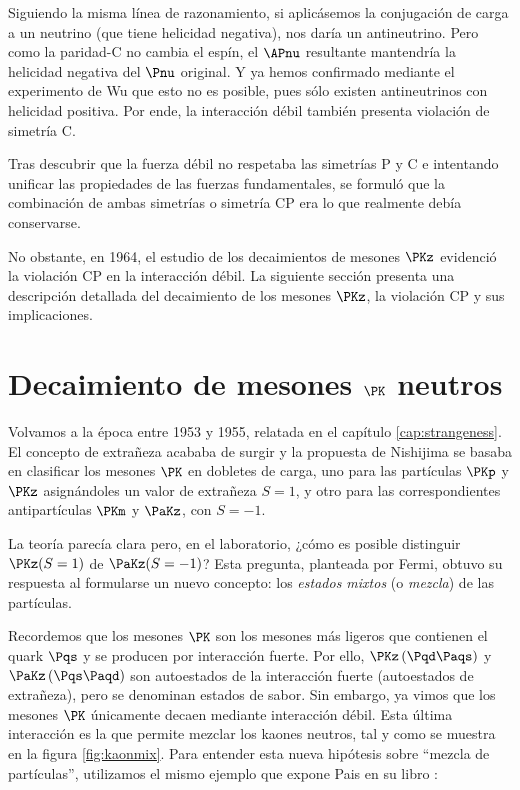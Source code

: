 Siguiendo la misma línea de razonamiento, si aplicásemos la conjugación de carga a un neutrino (que tiene helicidad negativa), nos daría un antineutrino. Pero como la paridad-C no cambia el espín, el $\APnu$ resultante mantendría la helicidad negativa del $\Pnu$ original. Y ya hemos confirmado mediante el experimento de Wu que esto no es posible, pues sólo existen antineutrinos con helicidad positiva. Por ende, la interacción débil también presenta violación de simetría C.

Tras descubrir que la fuerza débil no respetaba las simetrías P y C e intentando unificar las propiedades de las fuerzas fundamentales, se formuló que la combinación de ambas simetrías o simetría CP era lo que realmente debía conservarse.

No obstante, en 1964, el estudio de los decaimientos de mesones $\PKz$ evidenció la violación CP en la interacción débil. La siguiente sección presenta una descripción detallada del decaimiento de los mesones $\PKz$, la violación CP y sus implicaciones.
\vspace{5mm}

\section{Decaimiento de mesones $\PK$ neutros}
\label{sec:neutral_kaon_decay}
Volvamos a la época entre 1953 y 1955, relatada en el capítulo \ref{cap:strangeness}. El concepto de extrañeza acababa de surgir y la propuesta de Nishijima se basaba en clasificar los mesones $\PK$ en dobletes de carga, uno para las partículas $\PKp$ y $\PKz$ asignándoles un valor de extrañeza $S=1$, y otro para las correspondientes antipartículas $\PKm$ y $\PaKz$, con $S=-1$.

La teoría parecía clara pero, en el laboratorio, ¿cómo es posible distinguir $\PKz(S=1)$ de $\PaKz(S=-1)$? Esta pregunta, planteada por Fermi, obtuvo su respuesta al formularse un nuevo concepto: los \textit{estados mixtos} (o \textit{mezcla}) de las partículas.

Recordemos que los mesones $\PK$ son los mesones más ligeros que contienen el quark $\Pqs$ y se producen por interacción fuerte. Por ello, $\PKz\left(\Pqd\Paqs\right) $ y $\PaKz\left(\Pqs\Paqd\right)$ son autoestados de la interacción fuerte (autoestados de extrañeza), pero se denominan estados de sabor. Sin embargo, ya vimos que los mesones $\PK$ únicamente decaen mediante interacción débil. Esta última interacción es la que permite mezclar los kaones neutros, tal y como se muestra en la figura \ref{fig:kaonmix}. Para entender esta nueva hipótesis sobre ``mezcla de partículas'', utilizamos el mismo ejemplo que expone Pais en su libro \cite{Pais}:

